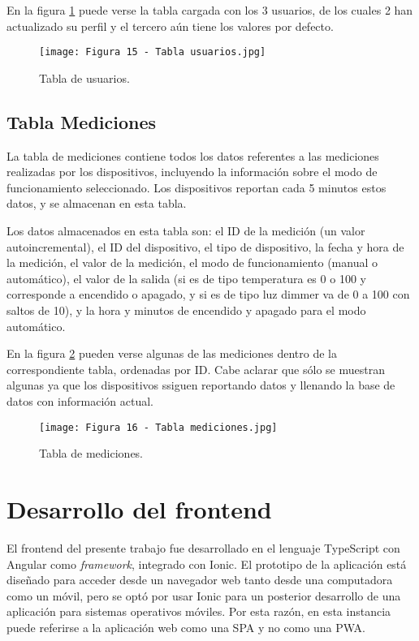 En la figura \ref{fig:15} puede verse la tabla cargada con los 3 usuarios, de los cuales 2 han actualizado su perfil y el tercero aún tiene los valores por defecto.

\begin{figure}[h]
\centering
\texttt{[image: Figura 15 - Tabla usuarios.jpg]}
\caption[Tabla de usuarios]{Tabla de usuarios.}
\label{fig:15}
\end{figure}

\subsection{Tabla Mediciones}

La tabla de mediciones contiene todos los datos referentes a las mediciones realizadas por los dispositivos, incluyendo la información sobre el modo de funcionamiento seleccionado. Los dispositivos reportan cada 5 minutos estos datos, y se almacenan en esta tabla.

Los datos almacenados en esta tabla son: el ID de la medición (un valor autoincremental), el ID del dispositivo, el tipo de dispositivo, la fecha y hora de la medición, el valor de la medición, el modo de funcionamiento (manual o automático), el valor de la salida (si es de tipo temperatura es 0 o 100 y corresponde a encendido o apagado, y si es de tipo luz dimmer va de 0 a 100 con saltos de 10), y la hora y minutos de encendido y apagado para el modo automático.

En la figura \ref{fig:16} pueden verse algunas de las mediciones dentro de la correspondiente tabla, ordenadas por ID. Cabe aclarar que sólo se muestran algunas ya que los dispositivos ssiguen reportando datos y llenando la base de datos con información actual.

\begin{figure}[h]
\centering
\texttt{[image: Figura 16 - Tabla mediciones.jpg]}
\caption[Tabla de mediciones]{Tabla de mediciones.}
\label{fig:16}
\end{figure}

\section{Desarrollo del frontend}

El frontend del presente trabajo fue desarrollado en el lenguaje TypeScript con Angular como \textit{framework}, integrado con Ionic. El prototipo de la aplicación está diseñado para acceder desde un navegador web tanto desde una computadora como un móvil, pero se optó por usar Ionic para un posterior desarrollo de una aplicación para sistemas operativos móviles. Por esta razón, en esta instancia puede referirse a la aplicación web como una SPA y no como una PWA.

